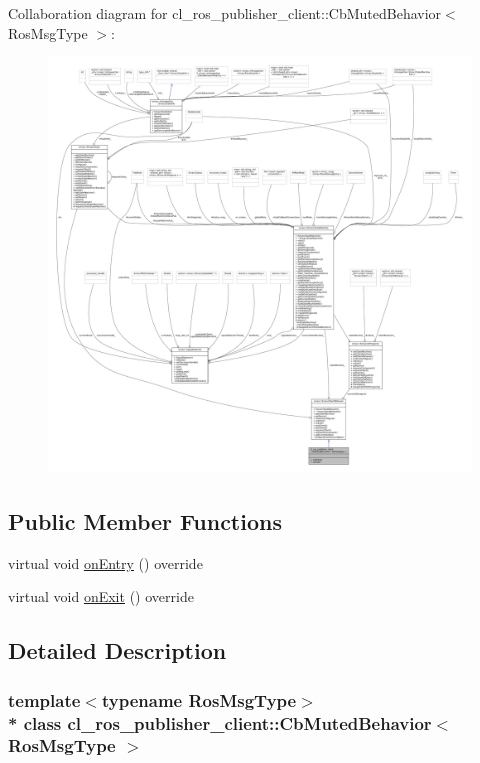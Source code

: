 Collaboration diagram for cl\+\_\+ros\+\_\+publisher\+\_\+client\+:\+:Cb\+Muted\+Behavior$<$ Ros\+Msg\+Type $>$\+:
\nopagebreak
\begin{figure}[H]
\begin{center}
\leavevmode
\includegraphics[width=350pt]{classcl__ros__publisher__client_1_1CbMutedBehavior__coll__graph}
\end{center}
\end{figure}
\subsection*{Public Member Functions}
\begin{DoxyCompactItemize}
\item 
virtual void \hyperlink{classcl__ros__publisher__client_1_1CbMutedBehavior_abc021ec81e87e59f98979d0b1d689c6b}{on\+Entry} () override
\item 
virtual void \hyperlink{classcl__ros__publisher__client_1_1CbMutedBehavior_a8e11bd2cff0a4f5b463e073d7d608ad2}{on\+Exit} () override
\end{DoxyCompactItemize}


\subsection{Detailed Description}
\subsubsection*{template$<$typename Ros\+Msg\+Type$>$\\*
class cl\+\_\+ros\+\_\+publisher\+\_\+client\+::\+Cb\+Muted\+Behavior$<$ Ros\+Msg\+Type $>$}



